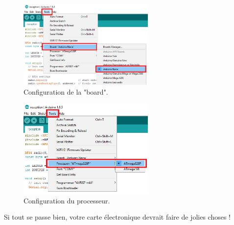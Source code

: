 \documentclass[a4paper,10pt,twoside]{article}
\begin{document}
\begin{figure}[ht!]
	\centering
	\includegraphics[width=0.6\textwidth]{imgs/arduino_board.png}
	\caption{Configuration de la "board".}
	\label{fig:arduino_board}
\end{figure}

\begin{figure}[ht!]
	\centering
	\includegraphics[width=0.6\textwidth]{imgs/arduino_processor.png}
	\caption{Configuration du processeur.}
	\label{fig:arduino_processor}
\end{figure}

Si tout se passe bien, votre carte électronique devrait faire de jolies choses ! 

\newpage
\end{document}
